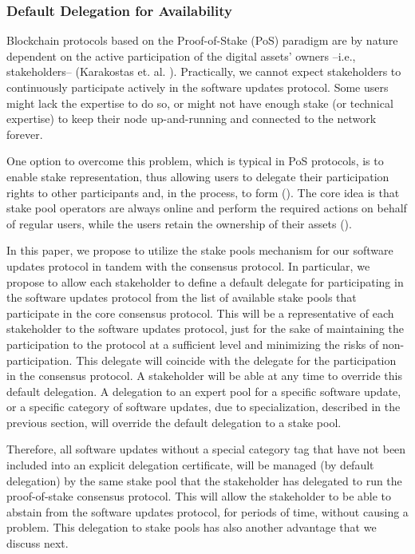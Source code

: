 \subsubsection{Default Delegation for Availability}\label{defaultdel}
Blockchain protocols based on the Proof-of-Stake (PoS) paradigm are by nature dependent on the active participation of the digital assets' owners --i.e., stakeholders-- (Karakostas et. al. \cite{stakepools}). Practically, we cannot expect stakeholders to continuously participate actively in the software updates protocol. Some users might lack the expertise to do so, or might not have enough stake (or technical expertise) to keep their node up-and-running and connected to the network forever.

One option to overcome this problem, which is typical in PoS protocols, is to enable stake representation, thus allowing users to delegate their participation rights to other participants and, in the process, to form
(\cite{stakepools}). The core idea is that stake pool operators are always online and perform
the required actions on behalf of regular users, while the users retain the ownership of their
assets (\cite{stakepools}). 

In this paper, we propose to utilize the stake pools mechanism for our software updates protocol in tandem with the consensus protocol. In particular, we propose to allow each stakeholder to define a default delegate for participating in the software updates protocol from the list of available stake pools that participate in the core consensus protocol. This will be a  representative of each stakeholder to the software updates protocol, just for the sake of maintaining the participation to the protocol at a sufficient level and minimizing the risks of non-participation. This delegate will coincide with the delegate for the participation in the consensus protocol. A stakeholder will be able at any time to override this default delegation. A delegation to an expert pool for a specific software update, or a specific category of software updates, due to specialization, described in the previous section, will override the default delegation to a stake pool.

Therefore,  all software updates without a special category tag that have not been included into an explicit delegation certificate, will be managed (by default delegation) by the same stake pool that the stakeholder has delegated to run the  proof-of-stake consensus protocol. This will allow the stakeholder to be able to abstain from the software updates protocol, for periods of time, without causing a problem. This delegation to stake pools has also another advantage that we discuss next.

